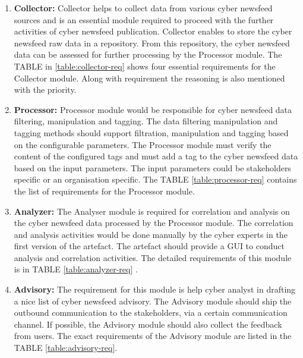 \begin{enumerate}

    \item \textbf{Collector:}
    Collector helps to collect data from various cyber newsfeed sources and is an essential module required to proceed with the further activities of cyber newsfeed publication. 
    Collector enables to store the cyber newsfeed raw data in a repository. From this repository, the cyber newsfeed data can be assessed for further processing by the Processor module. 
    The  TABLE in \ref{table:collector-req} shows four essential requirements for the Collector module. 
    Along with requirement the reasoning is also mentioned with the priority.



    \item \textbf{Processor:}
     Processor module would be responsible for cyber newsfeed data filtering, manipulation and tagging.
     The data filtering manipulation and tagging methods should support filtration, manipulation and tagging based on the configurable parameters. 
     The Processor module must verify the content of the configured tags and must add a tag to the cyber newsfeed data based on the input parameters. 
     The input parameters could be stakeholders specific or an organisation specific.
     The TABLE \ref{table:processor-req} contains the list of requirements for the Processor module.
    

    

    \item \textbf{Analyzer:}
    The Analyser module is required for correlation and analysis on the cyber newsfeed data processed by the Processor module. 
    The correlation and analysis activities would be done manually by the cyber experts in the first version of the artefact. The artefact should provide a GUI to conduct analysis and correlation activities. The detailed requirements of this module is in TABLE \ref{table:analyzer-req}
    .

    \item \textbf{Advisory:}
    The requirement for this module is help cyber analyst in drafting a nice list of cyber newsfeed advisory. The Advisory module should ship the outbound communication to the stakeholders, via a certain communication channel. If possible, the Advisory module should also collect the feedback from users. The exact requirements of the Advisory module are listed in the  TABLE \ref{table:advisory-req}.
   \FloatBarrier
\end{enumerate}

